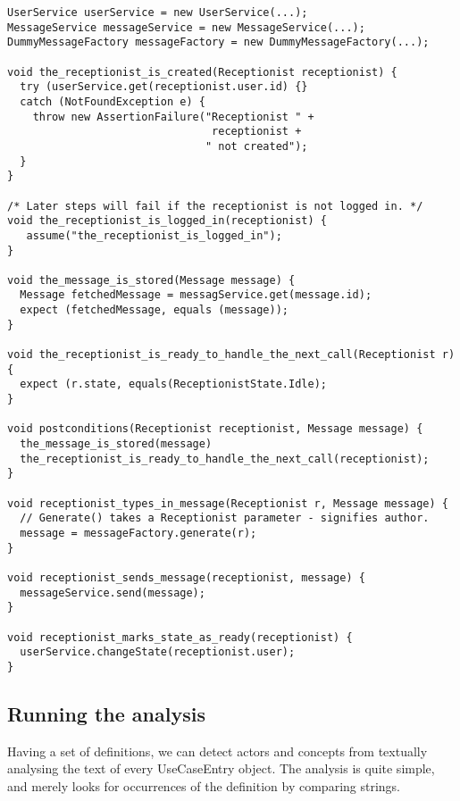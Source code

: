 \begin{lstlisting}[style=Dart, caption=Example template methods (written manually),label={lst:example-template-methods}]
UserService userService = new UserService(...);
MessageService messageService = new MessageService(...);
DummyMessageFactory messageFactory = new DummyMessageFactory(...);
  
void the_receptionist_is_created(Receptionist receptionist) {
  try (userService.get(receptionist.user.id) {}
  catch (NotFoundException e) {
    throw new AssertionFailure("Receptionist " + 
                                receptionist + 
                               " not created");
  }
}

/* Later steps will fail if the receptionist is not logged in. */
void the_receptionist_is_logged_in(receptionist) {
   assume("the_receptionist_is_logged_in");
}

void the_message_is_stored(Message message) {
  Message fetchedMessage = messagService.get(message.id);
  expect (fetchedMessage, equals (message));
}

void the_receptionist_is_ready_to_handle_the_next_call(Receptionist r) {
  expect (r.state, equals(ReceptionistState.Idle);
}

void postconditions(Receptionist receptionist, Message message) {
  the_message_is_stored(message)
  the_receptionist_is_ready_to_handle_the_next_call(receptionist);
}

void receptionist_types_in_message(Receptionist r, Message message) {
  // Generate() takes a Receptionist parameter - signifies author.
  message = messageFactory.generate(r);
}

void receptionist_sends_message(receptionist, message) {
  messageService.send(message);
}

void receptionist_marks_state_as_ready(receptionist) {
  userService.changeState(receptionist.user);
} 

\end{lstlisting}
\subsection{Running the analysis}
Having a set of definitions, we can detect actors and concepts from textually analysing the text of every UseCaseEntry object. The analysis is quite simple, and merely looks for occurrences of the definition by comparing strings.


